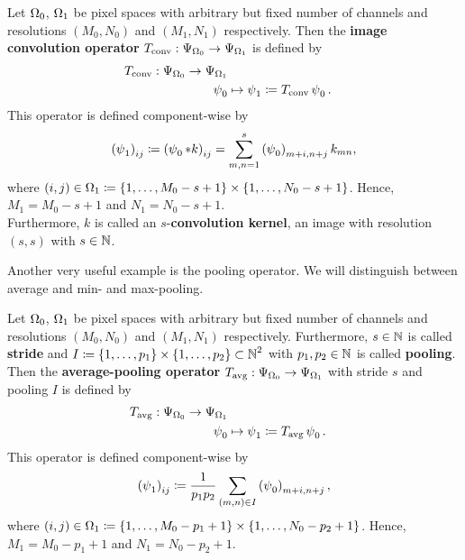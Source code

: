 \begin{proposition}\label{convolution}
Let $\Omega_0$, $\Omega_1$ be pixel spaces with arbitrary but fixed number of channels and resolutions $(M_0,N_0)$ and $(M_1,N_1)$ respectively. Then the \textbf{image convolution operator} $T_{\text{conv}}: \Psi_{\Omega_0} \to \Psi_{\Omega_1}$ is defined by
\begin{align*}
T_{\text{conv}}: \Psi_{\Omega_0} \to \Psi_{\Omega_1}\\
\operatorname{\psi}_0 &\mapsto \operatorname{\psi}_1 \coloneqq T_{\text{conv}}\operatorname{\psi}_0 .
\end{align*}
This operator is defined component-wise by
\begin{align}
\left( \operatorname{\psi}_1 \right)_{ij} \coloneqq  \left( \operatorname{\psi}_0 \ast k \right)_{ij} = \sum_{m,n=1}^s \left(\operatorname{\psi}_0\right)_{m+i,n+j}k_{mn},
\end{align}
where $(i,j) \in \Omega_1 \coloneqq \{1,\ldots, M_0-s+1\} \times \{1,\ldots, N_0-s+1\}$. Hence, $M_1 = M_0-s+1$ and $N_1 = N_0-s+1$.\\
Furthermore, $k$ is called an $s$-\textbf{convolution kernel}, an image with resolution $(s,s)$ with $s\in\operatorname{\mathbb{N}}$.
\end{proposition}

Another very useful example is the pooling operator. We will distinguish between average and min- and max-pooling.

\begin{proposition}\label{avg_pooling}
Let $\Omega_0$, $\Omega_1$ be pixel spaces with arbitrary but fixed number of channels and resolutions $(M_0,N_0)$ and $(M_1,N_1)$ respectively. Furthermore, $s\in\operatorname{\mathbb{N}}$ is called \textbf{stride} and $I\coloneqq \{1,\ldots,p_1\}\times \{1,\ldots,p_2\} \subset\operatorname{\mathbb{N}}^2$ with $p_1,p_2\in\operatorname{\mathbb{N}}$ is called \textbf{pooling}.\\
Then the \textbf{average-pooling operator} $T_{\text{avg}}: \Psi_{\Omega_0} \to \Psi_{\Omega_1}$ with stride $s$ and pooling $I$ is defined by
\begin{align*}
T_{\text{avg}}: \Psi_{\Omega_0} \to \Psi_{\Omega_1}\\
\operatorname{\psi}_0 &\mapsto \operatorname{\psi}_1 \coloneqq T_{\text{avg}}\operatorname{\psi}_0 .
\end{align*}
This operator is defined component-wise by
\begin{align}
\left(\operatorname{\psi}_1\right)_{ij} \coloneqq  \frac{1}{p_1p_2} \sum_{(m,n)\in I}\left(\operatorname{\psi}_0\right)_{m+i, n+j},
\end{align}
where $(i,j) \in \Omega_1 \coloneqq \{1,\ldots, M_0-p_1+1\} \times \{1,\ldots, N_0-p_2+1\}$. Hence, $M_1 = M_0-p_1+1$ and $N_1 = N_0-p_2+1$.
\end{proposition}

